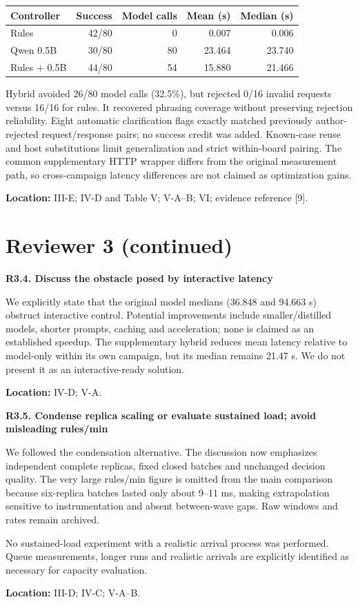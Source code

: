 \documentclass[11pt,a4paper]{article}
\newcommand{\point}[2]{\vspace{4pt}\textbf{#1. #2}\par}
\newcommand{\where}[1]{\par{\small\textcolor{ink}{\textbf{Location:} #1}}\par}
\begin{document}
\begin{center}\small
\begin{tabular}{lrrrr}\toprule
Controller & Success & Model calls & Mean (s) & Median (s)\\\midrule
Rules & 42/80 & 0 & 0.007 & 0.006\\
Qwen 0.5B & 30/80 & 80 & 23.464 & 23.740\\
Rules + 0.5B & 44/80 & 54 & 15.880 & 21.466\\\bottomrule
\end{tabular}
\end{center}
Hybrid avoided 26/80 model calls (32.5\%), but rejected 0/16 invalid requests versus 16/16 for rules. It recovered phrasing coverage without preserving rejection reliability. Eight automatic clarification flags exactly matched previously author-rejected request/response pairs; no success credit was added. Known-case reuse and host substitutions limit generalization and strict within-board pairing. The common supplementary HTTP wrapper differs from the original measurement path, so cross-campaign latency differences are not claimed as optimization gains.
\where{III-E; IV-D and Table V; V-A--B; VI; evidence reference [9].}

\newpage
\section*{Reviewer 3 (continued)}
\point{R3.4}{Discuss the obstacle posed by interactive latency}
We explicitly state that the original model medians (36.848 and 94.663 s) obstruct interactive control. Potential improvements include smaller/distilled models, shorter prompts, caching and acceleration; none is claimed as an established speedup. The supplementary hybrid reduces mean latency relative to model-only within its own campaign, but its median remains 21.47 s. We do not present it as an interactive-ready solution.
\where{IV-D; V-A.}

\point{R3.5}{Condense replica scaling or evaluate sustained load; avoid misleading rules/min}
We followed the condensation alternative. The discussion now emphasizes independent complete replicas, fixed closed batches and unchanged decision quality. The very large rules/min figure is omitted from the main comparison because six-replica batches lasted only about 9--11 ms, making extrapolation sensitive to instrumentation and absent between-wave gaps. Raw windows and rates remain archived.

No sustained-load experiment with a realistic arrival process was performed. Queue measurements, longer runs and realistic arrivals are explicitly identified as necessary for capacity evaluation.
\where{III-D; IV-C; V-A--B.}
\end{document}
